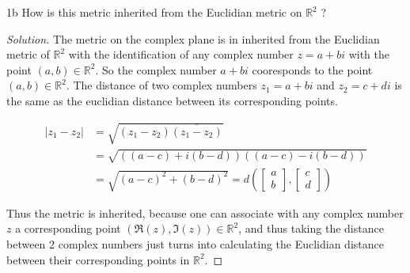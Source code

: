 \documentclass{article}
\newcommand{\R}{\mathbb{R}}
\newenvironment{solution}
{\renewcommand\qedsymbol{$\blacksquare$}\begin{proof}[Solution]}
{\end{proof}}
\begin{document}
\begin{PROB}{1b}\label{Problem 1b.}
    How is this metric inherited from the Euclidian metric on $\R^2$ ?
\end{PROB}
\begin{solution}
    The metric on the complex plane is in inherited from the Euclidian metric of $\R^2$ with the identification of any complex number $z = a + bi$ with the point $(a, b) \in \R^2$. So the complex number $a + bi$ cooresponds to the point $(a, b) \in \R^2$. The distance of two complex numbers $z_1 = a + bi$ and $z_2 = c + di$ is the same as the euclidian distance between its corresponding points. 
    
    \begin{align*}
        |z_1 - z_2| &= \sqrt{(z_1 - z_2)\overline{(z_1 - z_2)}}\\ 
        &= \sqrt{((a - c) + i(b - d))((a - c) - i(b - d))}\\ 
        &= \sqrt{(a - c)^2 + (b - d)^2} = d\left(\begin{bmatrix}
            a \\ b
        \end{bmatrix}, \begin{bmatrix}
            c \\ d
        \end{bmatrix}
        \right)
    \end{align*}

    Thus the metric is inherited, because one can associate with any complex number $z$  a corresponding point $(\Re(z), \Im(z)) \in \R^2$, and thus taking the distance between 2 complex numbers just turns into calculating the Euclidian distance between their corresponding points in $\R^2$. 
\end{solution}

\bigskip
\end{document}
